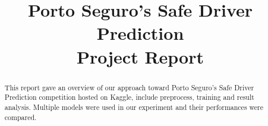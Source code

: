 \documentclass[conference]{IEEEtran}
\begin{document}
\title{Porto Seguro's Safe Driver Prediction\\Project Report}
\author{
}

\maketitle

\begin{abstract}
This report gave an overview of our approach toward Porto Seguro's Safe Driver
Prediction competition hosted on Kaggle, include preprocess, training and
result analysis. Multiple models were used in our experiment and their
performances were compared.

\end{abstract}















{}



\end{document}
